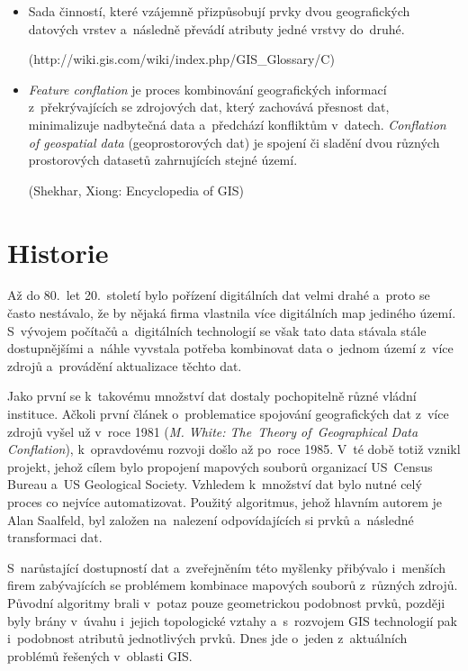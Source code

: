 \begin{itemize}[leftmargin=*]
  \item Sada činností, které vzájemně přizpůsobují prvky dvou geografických
    datových vrstev a~následně převádí atributy jedné vrstvy do~druhé. %
    
    (http://wiki.gis.com/wiki/index.php/GIS\_Glossary/C)
  
  \item \textit{Feature conflation} je proces kombinování geografických 
    informací z~překrývajících se zdrojových dat, který zachovává přesnost 
    dat, minimalizuje nadbytečná data a~předchází konfliktům v~datech. %
    \textit{Conflation of geospatial data} (geoprostorových dat) je spojení
    či sladění dvou různých prostorových datasetů zahrnujících stejné území.
    
     (Shekhar, Xiong: Encyclopedia of GIS)

\end{itemize}

\section{Historie} %
\label{historie}

Až do 80.~let 20.~století bylo pořízení digitálních dat velmi drahé a~proto 
se často nestávalo, že by nějaká firma vlastnila více digitálních map jediného 
území. S~vývojem počítačů a~digitálních technologií se však tato data stávala 
stále dostupnějšími a~náhle vyvstala potřeba kombinovat data o~jednom území 
z~více zdrojů a~provádění aktualizace těchto dat. 

Jako první se k~takovému množství dat dostaly pochopitelně různé vládní 
instituce. Ačkoli první článek o~problematice spojování geografických dat 
z~více zdrojů vyšel už v~roce 1981 (\textit{M. White: The~Theory of~Geographical
Data Conflation}), k~opravdovému rozvoji došlo až po~roce 1985. V~té době 
totiž vznikl projekt, jehož cílem bylo propojení mapových souborů organizací
US~Census Bureau a~US Geological Society. Vzhledem k~množství dat bylo nutné
celý proces co nejvíce automatizovat. Použitý algoritmus, jehož hlavním autorem
je Alan Saalfeld, byl založen na~nalezení odpovídajících si prvků a~následné 
transformaci dat. 

S~narůstající dostupností dat a~zveřejněním této myšlenky přibývalo i~menších 
firem zabývajících se problémem kombinace mapových souborů z~různých zdrojů. 
Původní algoritmy brali v~potaz pouze geometrickou podobnost prvků, později 
byly brány v~úvahu i~jejich topologické vztahy a~s~rozvojem GIS technologií 
pak i~podobnost atributů jednotlivých prvků. Dnes jde o~jeden z~aktuálních 
problémů řešených v~oblasti GIS.


